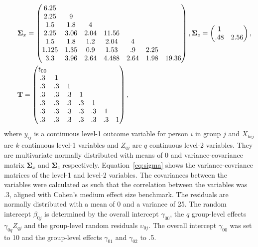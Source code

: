 \documentclass[10pt, a4paper, titlepage]{article}
\begin{document}
\begin{subequations}
\begin{align}
        &\hspace{.5cm}\boldsymbol{\Sigma}_{x} = \begin{pmatrix}
            6.25& & & & & & \\
            2.25& 9& & & & & \\
            1.5& 1.8& 4& & & & \\
            2.25& 3.06& 2.04& 11.56& & & \\
            1.5& 1.8& 1.2& 2.04& 4& & \\
            1.125& 1.35& 0.9& 1.53& .9& 2.25& \\
            3.3& 3.96& 2.64& 4.488& 2.64& 1.98& 19.36
        \end{pmatrix}, \boldsymbol{\Sigma}_{z} = \begin{pmatrix}
            1& \\
            .48& 2.56
        \end{pmatrix}, \label{eq:sigma} \\ 
        &\hspace{.5cm}\mathbf{T} = \begin{pmatrix}
            t_{00}& & & & & & \\
              .3& 1& & & & & \\
              .3& .3& 1& & & & \\
              .3& .3& .3& 1& & & \\
              .3& .3& .3& .3& 1& & \\
              .3& .3& .3& .3& .3& 1& \\
              .3& .3& .3& .3& .3& .3& 1
        \end{pmatrix} \label{eq:T},
\end{align}
\end{subequations} where $y_{ij}$ is a continuous level-1 outcome variable for person $i$ in group $j$ and $X_{kij}$ are $k$ continuous level-1 variables and $Z_{qj}$ are $q$ continuous level-2 variables. They are multivariate normally distributed with means of 0 and variance-covariance matrix $\boldsymbol{\Sigma}_{x}$ and $\boldsymbol{\Sigma}_{z}$ respectively. Equation~\ref{eq:sigma} shows the variance-covriance matrices of the level-1 and level-2 variables. The covariances between the variables were calculated as such that the correlation between the variables was .3, aligned with Cohen's \citeyearpar{cohen1990} medium effect size benchmark. The residuals are normally distributed with a mean of 0 and a variance of 25. The random intercept $\beta_{0j}$ is determined by the overall intercept $\gamma_{00}$, the $q$ group-level effects $\gamma_{0q}Z_{qj}$ and the group-level random residuals $\upsilon_{0j}$. The overall intercept $\gamma_{00}$ was set to 10 and the group-level effects $\gamma_{01}$ and $\gamma_{02}$ to .5.
\end{document}
